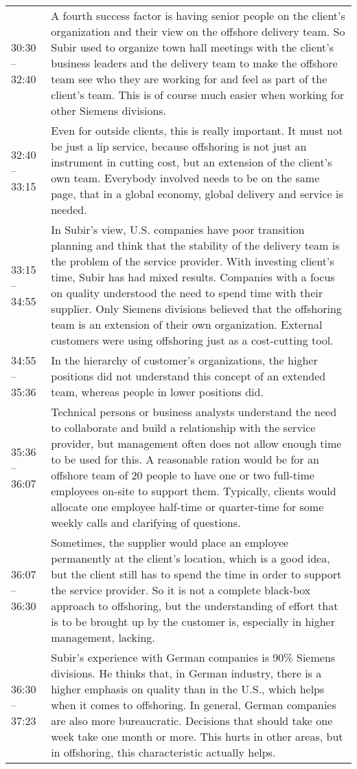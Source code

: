 \begin{appendix}
\begin{longtable}{l p{12.5cm}}
	30:30 -- 32:40&A fourth success factor is having senior people on the client's organization and their view on the offshore delivery team. So Subir used to organize town hall meetings with the client's business leaders and the delivery team to make the offshore team see who they are working for and feel as part of the client's team. This is of course much easier when working for other Siemens divisions.\\
	32:40 -- 33:15&Even for outside clients, this is really important. It must not be just a lip service, because offshoring is not just an instrument in cutting cost, but an extension of the client's own team. Everybody involved needs to be on the same page, that in a global economy, global delivery and service is needed.\\
	33:15 -- 34:55&In Subir's view, U.S. companies have poor transition planning and think that the stability of the delivery team is the problem of the service provider. With investing client's time, Subir has had mixed results. Companies with a focus on quality understood the need to spend time with their supplier. Only Siemens divisions believed that the offshoring team is an extension of their own organization. External customers were using offshoring just as a cost-cutting tool.\\
	34:55 -- 35:36& In the hierarchy of customer's organizations, the higher positions did not understand this concept of an extended team, whereas people in lower positions did.\\
	35:36 -- 36:07& Technical persons or business analysts understand the need to collaborate and build a relationship with the service provider, but management often does not allow enough time to be used for this. A reasonable ration would be for an offshore team of 20 people to have one or two full-time employees on-site to support them. Typically, clients would allocate one employee half-time or quarter-time for some weekly calls and clarifying of questions.\\
	36:07 -- 36:30&Sometimes, the supplier would place an employee permanently at the client's location, which is a good idea, but the client still has to spend the time in order to support the service provider. So it is not a complete black-box approach to offshoring, but the understanding of effort that is to be brought up by the customer is, especially in higher management, lacking.\\
	36:30 -- 37:23&Subir's experience with German companies is 90\% Siemens divisions. He thinks that, in German industry, there is a higher emphasis on quality than in the U.S., which helps when it comes to offshoring. In general, German companies are also more bureaucratic. Decisions that should take one week take one month or more. This hurts in other areas, but in offshoring, this characteristic actually helps.\\

\end{longtable}
\end{appendix}
